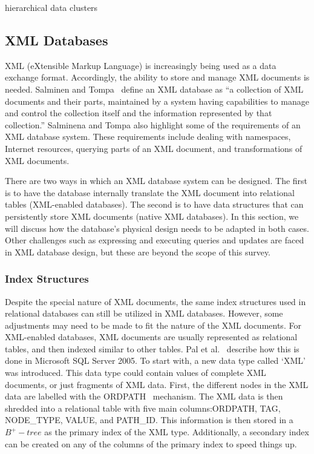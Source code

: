 \documentclass[12pt,a4paper]{article}
\begin{document}
hierarchical data clusters \cite{karayannidis2008hierarchical}

\subsection{XML Databases}
\label{SEC-XML}

XML (eXtensible Markup Language) is increasingly being used as a data exchange format. Accordingly, the ability to store and manage XML documents is needed.
Salminen and Tompa~\cite{salminen2001requirements} define an XML database as ``a collection of XML documents and their parts, maintained by a system
having capabilities to manage and control the collection itself and the information represented by that collection.'' Salminena and Tompa also highlight some of
the requirements of an XML database system. These requirements include dealing with namespaces, Internet resources, querying parts of an XML document, and
transformations of XML documents.

There are two ways in which an XML database system can be designed. The first is to have the database internally translate the XML document into relational
tables (XML-enabled databases). The second is to have data structures that can persistently store XML documents (native XML databases). In this section, we will
discuss how the database's physical design needs to be adapted in both cases. Other challenges such as expressing and executing queries and updates are faced in
XML database design, but these are beyond the scope of this survey.



\subsubsection{Index Structures}

Despite the special nature of XML documents, the same index structures used in relational databases can still be utilized in XML databases. However, some
adjustments may need to be made to fit the nature of the XML documents. For XML-enabled databases, XML documents are usually represented as relational tables,
and then indexed similar to other tables. Pal et al.~\cite{pal2004indexing} describe how this is done in Microsoft SQL Server 2005. To start with, a new data
type called `XML' was introduced. This data type could contain values of complete XML documents, or just fragments of XML data. First, the different nodes in
the XML data are labelled with the ORDPATH~\cite{o2004ordpaths} mechanism. The XML data is then shredded into a relational table with five main columns:ORDPATH,
TAG, NODE\_TYPE, VALUE, and PATH\_ID. This information is then stored in a $B^{+}-tree$ as the primary index of the XML type. Additionally, a secondary index
can be created on any of the columns of the primary index to speed things up.
\end{document}
